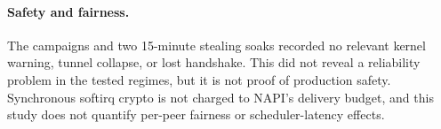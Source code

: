 \paragraph{Safety and fairness.}
The campaigns and two 15-minute stealing soaks recorded no relevant kernel
warning, tunnel collapse, or lost handshake.  This did not reveal a reliability
problem in the tested regimes, but it is not proof of production safety.
Synchronous softirq crypto is not charged to NAPI's delivery budget, and this
study does not quantify per-peer fairness or scheduler-latency effects.
\par\endgroup
